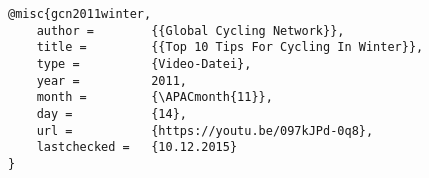 \documentclass{scrartcl}
\begin{document}
\lstset{
language=TeX,
basicstyle=\small\ttfamily,
numbers=left,
numberstyle=\tiny,%
frame=b,%
columns=fullflexible,
showstringspaces=false
}

\begin{lstlisting}[label=some-code,caption=Beispiel BibTeX-Eintrag für YouTube]
@misc{gcn2011winter,
    author =        {{Global Cycling Network}},
    title =         {{Top 10 Tips For Cycling In Winter}},
    type =          {Video-Datei},
    year =          2011,
    month =         {\APACmonth{11}},
    day =           {14},
    url =           {https://youtu.be/097kJPd-0q8},
    lastchecked =   {10.12.2015}
}
\end{lstlisting}
\end{document}
